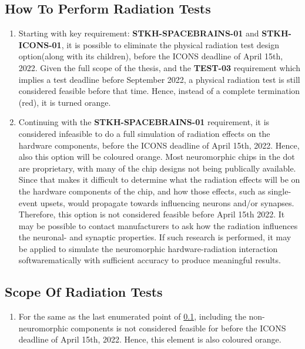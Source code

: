 \subsection{How To Perform Radiation Tests}\label{subsec:baseline_how_to_perform_radiation_tests}
\begin{enumerate}
    \item Starting with key requirement: \textbf{STKH-SPACEBRAINS-01} and \textbf{STKH-ICONS-01}, it is possible to eliminate the physical radiation test design option(along with its children), before the ICONS deadline of April 15th, 2022. Given the full scope of the thesis, and the \textbf{TEST-03} requirement which implies a test deadline before September 2022, a physical radiation test is still considered feasible before that time. Hence, instead of a complete termination (red), it is turned orange.
    \item Continuing with the \textbf{STKH-SPACEBRAINS-01} requirement, it is considered infeasible to do a full simulation of radiation effects on the hardware components, before the ICONS deadline of April 15th, 2022. Hence, also this option will be coloured orange. Most neuromorphic chips in the \acrshort{dot} are proprietary, with many of the chip designs not being publically available. Since that makes it difficult to determine what the radiation effects will be on the hardware components of the chip, and how those effects, such as single-event upsets, would propagate towards influencing neurons and/or synapses. Therefore, this option is not considered feasible before April 15th 2022. It may be possible to contact manufacturers to ask how the radiation influences the neuronal- and synaptic properties. If such research is performed, it may be applied to simulate the neuromorphic hardware-radiation interaction softwarematically with sufficient accuracy to produce meaningful results.
\end{enumerate}   
\subsection{Scope Of Radiation Tests}\label{subsec:baseline_scope_of_radiation_tests}
\begin{enumerate}
    \item For the same as the last enumerated point of \cref{subsec:baseline_how_to_perform_radiation_tests}, including the non-neuromorphic components is not considered feasible for before the ICONS deadline of April 15th, 2022. Hence, this element is also coloured orange.
\end{enumerate}

